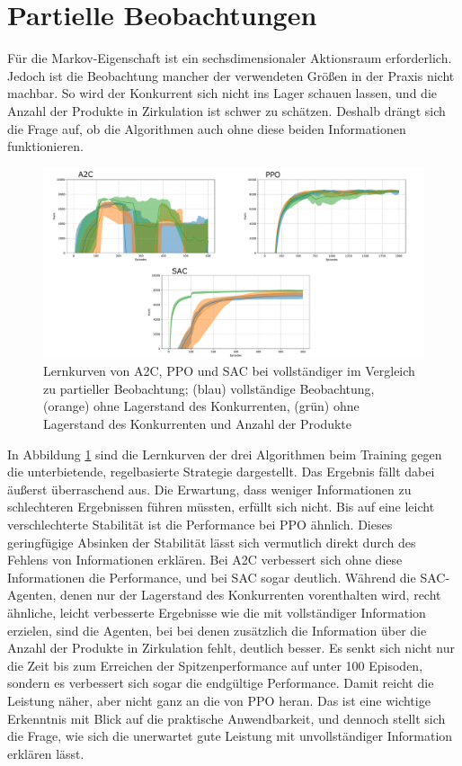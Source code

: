\section{Partielle Beobachtungen}
\label{section:partial_markov}
Für die Markov-Eigenschaft ist ein sechsdimensionaler Aktionsraum erforderlich.
Jedoch ist die Beobachtung mancher der verwendeten Größen in der Praxis nicht machbar.
So wird der Konkurrent sich nicht ins Lager schauen lassen, und die Anzahl der Produkte in Zirkulation ist schwer zu schätzen.
Deshalb drängt sich die Frage auf, ob die Algorithmen auch ohne diese beiden Informationen funktionieren.

\begin{figure}[htb]
	\centering
	\includegraphics[width=\textwidth]{main/partial_observation.pdf}
	\caption{Lernkurven von A2C, PPO und SAC bei vollständiger im Vergleich zu partieller Beobachtung; (blau) vollständige Beobachtung, (orange) ohne Lagerstand des Konkurrenten, (grün) ohne Lagerstand des Konkurrenten und Anzahl der Produkte
	}
	\label{graphic:PartialObservation}
\end{figure}

In Abbildung \ref{graphic:PartialObservation} sind die Lernkurven der drei Algorithmen beim Training gegen die unterbietende, regelbasierte Strategie dargestellt.
Das Ergebnis fällt dabei äußerst überraschend aus.
Die Erwartung, dass weniger Informationen zu schlechteren Ergebnissen führen müssten, erfüllt sich nicht.
Bis auf eine leicht verschlechterte Stabilität ist die Performance bei PPO ähnlich.
Dieses geringfügige Absinken der Stabilität lässt sich vermutlich direkt durch des Fehlens von Informationen erklären.
Bei A2C verbessert sich ohne diese Informationen die Performance, und bei SAC sogar deutlich.
Während die SAC-Agenten, denen nur der Lagerstand des Konkurrenten vorenthalten wird, recht ähnliche, leicht verbesserte Ergebnisse wie die mit vollständiger Information erzielen, sind die Agenten, bei bei denen zusätzlich die Information über die Anzahl der Produkte in Zirkulation fehlt, deutlich besser.
Es senkt sich nicht nur die Zeit bis zum Erreichen der Spitzenperformance auf unter 100 Episoden, sondern es verbessert sich sogar die endgültige Performance.
Damit reicht die Leistung näher, aber nicht ganz an die von PPO heran.
Das ist eine wichtige Erkenntnis mit Blick auf die praktische Anwendbarkeit, und dennoch stellt sich die Frage, wie sich die unerwartet gute Leistung mit unvollständiger Information erklären lässt.


